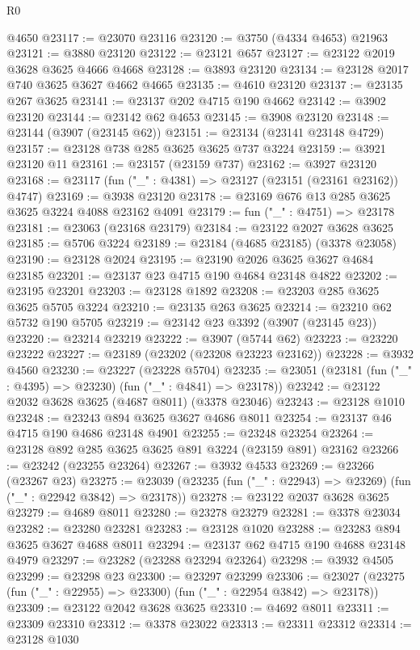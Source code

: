 \begin{lexlean}{R0}
\begin{coremodule}
    @4650
@23117 := @23070 @23116
@23120 := @3750 (@4334 @4653) @21963
@23121 := @3880 @23120
@23122 := @23121 @657
@23127 := @23122 @2019 @3628 @3625 @4666 @4668
@23128 := @3893 @23120
@23134 := @23128 @2017 @740 @3625 @3627 @4662 @4665
@23135 := @4610 @23120
@23137 := @23135 @267 @3625
@23141 := @23137 @202 @4715 @190 @4662
@23142 := @3902 @23120
@23144 := @23142 @62 @4653
@23145 := @3908 @23120
@23148 := @23144 (@3907 (@23145 @62))
@23151 := @23134 (@23141 @23148 @4729)
@23157 := @23128 @738 @285 @3625 @3625 @737 @3224
@23159 := @3921 @23120 @11
@23161 := @23157 (@23159 @737)
@23162 := @3927 @23120
@23168 := @23117 (fun ("_" : @4381) => @23127 (@23151 (@23161 @23162)) @4747)
@23169 := @3938 @23120
@23178 := @23169 @676 @13 @285 @3625 @3625 @3224 @4088 @23162 @4091
@23179 := fun ("_" : @4751) => @23178
@23181 := @23063 (@23168 @23179)
@23184 := @23122 @2027 @3628 @3625
@23185 := @5706 @3224
@23189 := @23184 (@4685 @23185) (@3378 @23058)
@23190 := @23128 @2024
@23195 := @23190 @2026 @3625 @3627 @4684 @23185
@23201 := @23137 @23 @4715 @190 @4684 @23148 @4822
@23202 := @23195 @23201
@23203 := @23128 @1892
@23208 := @23203 @285 @3625 @3625 @5705 @3224
@23210 := @23135 @263 @3625
@23214 := @23210 @62 @5732 @190 @5705
@23219 := @23142 @23 @3392 (@3907 (@23145 @23))
@23220 := @23214 @23219
@23222 := @3907 (@5744 @62)
@23223 := @23220 @23222
@23227 := @23189 (@23202 (@23208 @23223 @23162))
@23228 := @3932 @4560
@23230 := @23227 (@23228 @5704)
@23235 := @23051 (@23181 (fun ("_" : @4395) => @23230) (fun ("_" : @4841) => @23178))
@23242 := @23122 @2032 @3628 @3625 (@4687 @8011) (@3378 @23046)
@23243 := @23128 @1010
@23248 := @23243 @894 @3625 @3627 @4686 @8011
@23254 := @23137 @46 @4715 @190 @4686 @23148 @4901
@23255 := @23248 @23254
@23264 := @23128 @892 @285 @3625 @3625 @891 @3224 (@23159 @891) @23162
@23266 := @23242 (@23255 @23264)
@23267 := @3932 @4533
@23269 := @23266 (@23267 @23)
@23275 := @23039 (@23235 (fun ("_" : @22943) => @23269) (fun ("_" : @22942 @3842) => @23178))
@23278 := @23122 @2037 @3628 @3625
@23279 := @4689 @8011
@23280 := @23278 @23279
@23281 := @3378 @23034
@23282 := @23280 @23281
@23283 := @23128 @1020
@23288 := @23283 @894 @3625 @3627 @4688 @8011
@23294 := @23137 @62 @4715 @190 @4688 @23148 @4979
@23297 := @23282 (@23288 @23294 @23264)
@23298 := @3932 @4505
@23299 := @23298 @23
@23300 := @23297 @23299
@23306 := @23027 (@23275 (fun ("_" : @22955) => @23300) (fun ("_" : @22954 @3842) => @23178))
@23309 := @23122 @2042 @3628 @3625
@23310 := @4692 @8011
@23311 := @23309 @23310
@23312 := @3378 @23022
@23313 := @23311 @23312
@23314 := @23128 @1030

\end{coremodule}
\end{lexlean}
